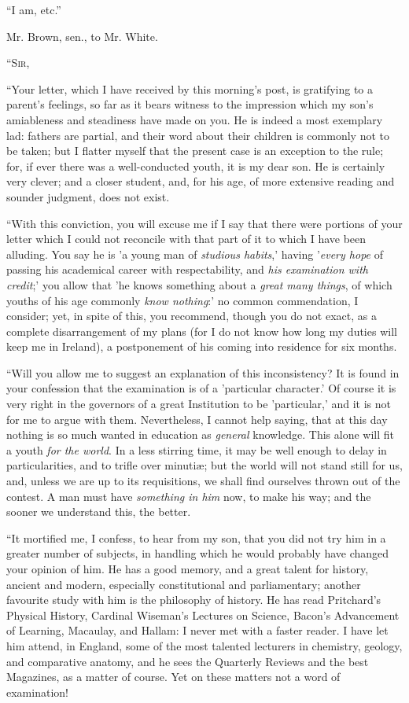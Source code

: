 ``I am, etc.''

Mr. Brown, sen., to Mr. White.

``S\textsc{ir},

``Your letter, which I have received by this morning's post, is
gratifying to a parent's feelings, so far as it bears witness to the
impression which my son's amiableness and steadiness have made on you.
He is indeed a most exemplary lad: fathers are partial, and their word
about their children is commonly not to be taken; but I flatter myself
that the present case is an exception to the rule; for, if ever there
was a well-conducted youth, it is my dear son. He is certainly very
clever; and a closer student, and, for his age, of more extensive
reading and sounder judgment, does not exist.

``With this conviction, you will excuse me if I say that there
were portions of your letter which I could not reconcile with that
part of it to which I have been alluding. You say he is 'a young man
of \emph{studious habits},' having '\emph{every hope} of passing his
academical career with respectability, and \emph{his examination
with credit};' you allow that 'he knows something about a \emph{great
many things}, of which youths of his age commonly \emph{know nothing}:'
no common commendation, I consider; yet, in spite of this, you
recommend, though you do not exact, as a complete disarrangement of my
plans (for I do not know how long my duties will keep me in Ireland),
a postponement of his coming into residence for six months.

``Will you allow me to suggest an explanation of this
inconsistency? It is found in your confession that the examination is
of a 'particular character.' Of course it is very right in the
governors of a great Institution to be 'particular,' and it is not for
me to argue with them. Nevertheless, I cannot help saying, that at
this day nothing is so much wanted in education as \emph{general}
knowledge. This alone will fit a youth \emph{for the world}. In a less
stirring time, it may be well enough to delay in particularities, and
to trifle over minutiæ; but the world will not stand still for us,
and, unless we are up to its requisitions, we shall find ourselves
thrown out of the contest. A man must have \emph{something in him}
now, to make his way; and the sooner we understand this, the better.

``It mortified me, I confess, to hear from my son, that you did
not try him in a greater number of subjects, in handling which he
would probably have changed your opinion of him. He has a good memory,
and a great talent for history, ancient and modern, especially
constitutional and parliamentary; another favourite study with him is
the philosophy of history. He has read Pritchard's Physical History,
Cardinal Wiseman's Lectures on Science, Bacon's Advancement of
Learning, Macaulay, and Hallam: I never met with a faster reader.
I have let him attend, in England, some of the most talented
lecturers in chemistry, geology, and comparative anatomy, and he sees
the Quarterly Reviews and the best Magazines, as a matter of course.
Yet on these matters not a word of examination!

